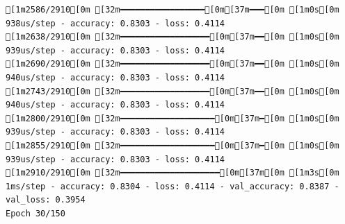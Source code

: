 \documentclass[
  letterpaper,
  DIV=11,
  numbers=noendperiod]{scrartcl}
\begin{document}
\begin{verbatim}
[1m2586/2910[0m [32m━━━━━━━━━━━━━━━━━[0m[37m━━━[0m [1m0s[0m 938us/step - accuracy: 0.8303 - loss: 0.4114
[1m2638/2910[0m [32m━━━━━━━━━━━━━━━━━━[0m[37m━━[0m [1m0s[0m 939us/step - accuracy: 0.8303 - loss: 0.4114
[1m2690/2910[0m [32m━━━━━━━━━━━━━━━━━━[0m[37m━━[0m [1m0s[0m 940us/step - accuracy: 0.8303 - loss: 0.4114
[1m2743/2910[0m [32m━━━━━━━━━━━━━━━━━━[0m[37m━━[0m [1m0s[0m 940us/step - accuracy: 0.8303 - loss: 0.4114
[1m2800/2910[0m [32m━━━━━━━━━━━━━━━━━━━[0m[37m━[0m [1m0s[0m 939us/step - accuracy: 0.8303 - loss: 0.4114
[1m2855/2910[0m [32m━━━━━━━━━━━━━━━━━━━[0m[37m━[0m [1m0s[0m 939us/step - accuracy: 0.8303 - loss: 0.4114
[1m2910/2910[0m [32m━━━━━━━━━━━━━━━━━━━━[0m[37m[0m [1m3s[0m 1ms/step - accuracy: 0.8304 - loss: 0.4114 - val_accuracy: 0.8387 - val_loss: 0.3954
Epoch 30/150


\end{verbatim}
\end{document}
